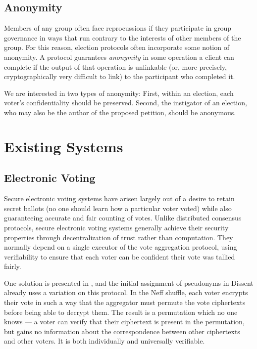 
  \subsection{Anonymity}\label{Subsection:anon}
  Members of any group often face reprocussions if they participate in group
  governance in ways that run contrary to the interests of other members of
  the group. For this reason, election protocols often incorporate some notion
  of anonymity. A protocol guarantees \emph{anonymity} in some operation a
  client can complete if the output of that operation is unlinkable (or, more
  precisely, cryptographically very difficult to link) to the participant who
  completed it\cite{ford_hiding_2014}.

  We are interested in two types of anonymity: First, within an election,
  each voter's confidentiality should be preserved. Second, the instigator of an
  election, who may also be the author of the proposed petition, should be
  anonymous.

\section{Existing Systems}
\subsection{Electronic Voting} \label{Subsection:evoting}
  Secure electronic voting systems have arisen largely out of a desire to
  retain secret ballots (no one should learn how a particular voter voted)
  while also guaranteeing accurate and fair counting of votes. Unlike
  distributed consensus protocols, secure electronic voting systems generally
  achieve their security properties through decentralization of trust rather
  than computation. They normally depend on a single executor of the vote
  aggregation protocol, using verifiability to ensure that each voter can be
  confident their vote was tallied fairly.

  One solution is presented in \cite{neff}, and the initial assignment of
  pseudonyms in Dissent already uses a variation on this protocol. In the Neff
  shuffle, each voter encrypts their vote in such a way that the aggregator
  must permute the vote ciphertexts before being able to decrypt them. The
  result is a permutation which no one knows --- a voter can verify that their
  ciphertext is present in the permutation, but gains no information about the
  correspondence between other ciphertexts and other voters. It is both
  individually and universally verifiable.

